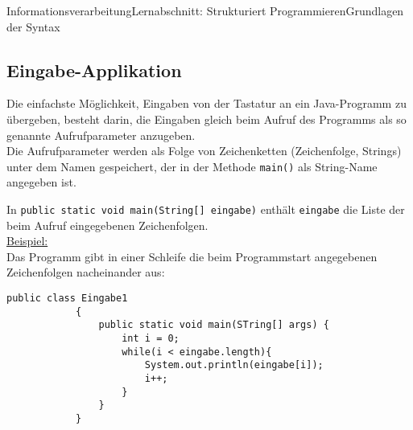 \documentclass[11pt,oneside,openany,headings=optiontotoc,11pt,numbers=noenddot]{article}
\begin{document}
\begin{worksheet}{Informationsverarbeitung}{Lernabschnitt: Strukturiert Programmieren}{Grundlagen der Syntax}
		\subsection{Eingabe-Applikation}
		Die einfachste Möglichkeit, Eingaben von der Tastatur an ein Java-Programm zu übergeben, besteht darin, die Eingaben gleich beim Aufruf des Programms als so genannte Aufrufparameter anzugeben.\\
		Die Aufrufparameter werden als Folge von Zeichenketten (Zeichenfolge, Strings) unter dem Namen gespeichert, der in der Methode \lstinline[style=JavaInputStyle]|main()| als String-Name angegeben ist.\\
		\par\noindent
		In \lstinline[style=JavaInputStyle]|public static void main(String[] eingabe)| enthält \lstinline[style=JavaInputStyle]|eingabe| die Liste der beim Aufruf eingegebenen Zeichenfolgen.\\
		\underline{Beispiel:}\\
		Das Programm gibt in einer Schleife die beim Programmstart angegebenen Zeichenfolgen nacheinander aus:
		\begin{lstlisting}[style=JavaInputStyle]
			public class Eingabe1
			{
				public static void main(STring[] args) {
					int i = 0;
					while(i < eingabe.length){
						System.out.println(eingabe[i]);
						i++;
					}
				}
			}
		\end{lstlisting}
		

\end{worksheet}
\end{document}
